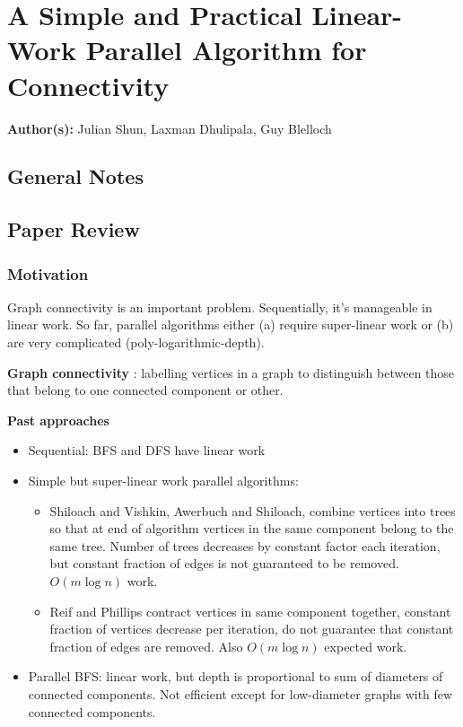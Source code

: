 \section{A Simple and Practical Linear-Work Parallel Algorithm for Connectivity}

\textbf{Author(s):} Julian Shun, Laxman Dhulipala, Guy Blelloch

\subsection{General Notes}


\subsection{Paper Review}

\subsubsection{Motivation}

Graph connectivity is an important problem. Sequentially, it's manageable in linear work. So far, parallel algorithms either (a) require super-linear work or (b) are very complicated (poly-logarithmic-depth).

\textbf{Graph connectivity} : labelling vertices in a graph to distinguish between those that belong to one connected component or other.

\textbf{Past approaches}
\begin{itemize}
    \item Sequential: BFS and DFS have linear work
    \item Simple but super-linear work parallel algorithms:
    \begin{itemize}
        \item Shiloach and Vishkin, Awerbuch and Shiloach, combine vertices into trees so that at end of algorithm vertices in the same component belong to the same tree. Number of trees decreases by constant factor each iteration, but constant fraction of edges is not guaranteed to be removed. $O(m \log n)$ work.
        \item Reif and Phillips contract vertices in same component together, constant fraction of vertices decrease per iteration, do not guarantee that constant fraction of edges are removed. Also $O(m \log n)$ expected work.
    \end{itemize} 
    \item Parallel BFS: linear work, but depth is proportional to sum of diameters of connected components. Not efficient except for low-diameter graphs with few connected components.
\end{itemize}

